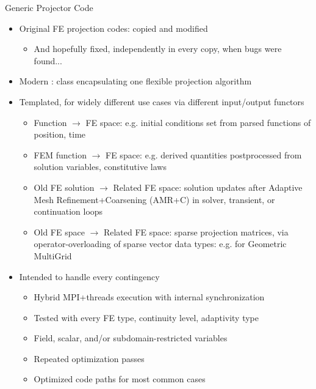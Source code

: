 %
%


\begin{frame}{Generic Projector Code}
\begin{itemize}
  \item Original  FE projection codes: copied and
    modified
  \begin{itemize}
    \item And hopefully fixed, independently in every copy, when bugs
      were found...
  \end{itemize}
  \item Modern : class encapsulating
    one flexible projection algorithm
  \item Templated, for widely different use cases via different
    input/output functors
  \begin{itemize}
    \item Function $\rightarrow$ FE space: e.g. initial conditions set
      from parsed functions of position, time
    \item FEM function $\rightarrow$ FE space: e.g. derived quantities
      postprocessed from solution variables, constitutive laws
    \item Old FE solution $\rightarrow$ Related FE space: solution updates
      after Adaptive Mesh Refinement+Coarsening (AMR+C) in solver, transient,
      or continuation loops
    \item Old FE space $\rightarrow$ Related FE space: sparse projection
      matrices, via operator-overloading of  sparse
      vector data types: e.g. for Geometric MultiGrid
  \end{itemize}
  \item Intended to handle every contingency
  \begin{itemize}
    \item Hybrid MPI+threads execution with internal synchronization
    \item Tested with every  FE type, continuity level,
      adaptivity type
    \item Field, scalar, and/or subdomain-restricted variables
    \item Repeated optimization passes
    \item Optimized code paths for most common cases
  \end{itemize}
\end{itemize}
\end{frame}


